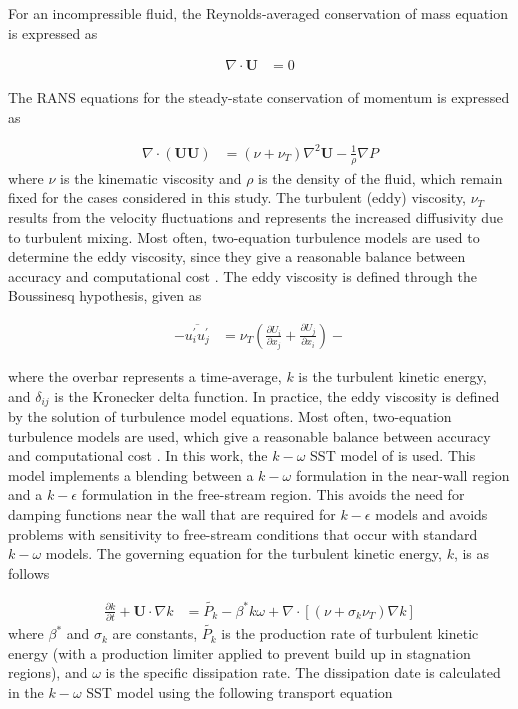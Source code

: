 For an incompressible fluid, the Reynolds-averaged conservation of mass equation is expressed as

\begin{align}
\nabla \cdot \mathbf{U} &= 0
\end{align}

The RANS equations for the steady-state conservation of momentum is expressed as 

\begin{align}
\nabla \cdot (\mathbf{UU}) &= \left(\nu + \nu_T\right) \nabla ^2 \mathbf{U} - \frac{1}{\rho} \nabla P 
\end{align}
% 
where $\nu$ is the kinematic viscosity and $\rho$ is the density of the fluid, which remain fixed for the cases considered in this study. The turbulent (eddy) viscosity, $\nu_T$ results from the velocity fluctuations and represents the increased diffusivity due to turbulent mixing. Most often, two-equation turbulence models are used to determine the eddy viscosity, since they give a reasonable balance between accuracy and computational cost \cite{versteeg1995}.
\skippingparagraph
The eddy viscosity is defined through the Boussinesq hypothesis, given as 

\begin{align}
-\overline{u_i^\prime u_j^\prime}
&= \nu_T \left(\frac{\partial U_i}{\partial x_j} + \frac{\partial U_j}{\partial x_i} \right) - %
\end{align}

where the overbar represents a time-average, $k$ is the turbulent kinetic energy, and $\delta_{ij}$ is the Kronecker delta function. In practice, the eddy viscosity is defined by the solution of turbulence model equations. Most often, two-equation turbulence models are used, which give a reasonable balance between accuracy and computational cost \cite{versteeg1995}. 
\skippingparagraph
In this work, the $k-\omega$ SST model of \cite{menter1994} is used. This model implements a blending between a $k-\omega$ formulation in the near-wall region and a $k-\epsilon$ formulation in the free-stream region. This avoids the need for damping functions near the wall that are required for $k-\epsilon$ models and avoids problems with sensitivity to free-stream conditions that occur with standard $k-\omega$ models.
\skippingparagraph
The governing equation for the turbulent kinetic energy, $k$, is as follows \cite{menter1994}

\begin{align}
\frac{\partial k}{\partial t} + \mathbf{U}  \cdot \nabla  k &= \tilde{P_k} - \beta^*k\omega + \nabla \cdot \left[(\nu + \sigma_k \nu_T)\nabla k \right]
\label{eq:k}
\end{align}
%
where $\beta^*$ and $\sigma_k$ are constants, $\tilde{P_k}$ is the production rate of turbulent kinetic energy (with a production limiter applied to prevent build up in stagnation regions), and $\omega$ is the specific dissipation rate. The dissipation date is calculated in the $k-\omega$ SST model using the following transport equation \cite{menter1994}

